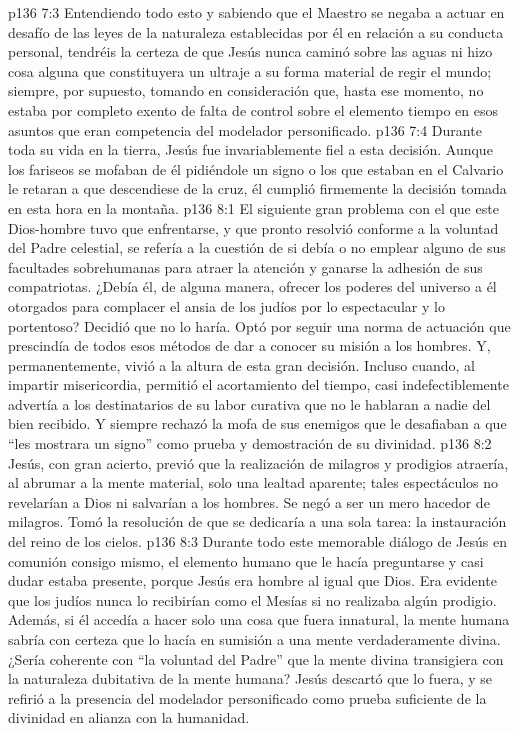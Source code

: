 \vs p136 7:3 \pc Entendiendo todo esto y sabiendo que el Maestro se negaba a actuar en desafío de las leyes de la naturaleza establecidas por él en relación a su conducta personal, tendréis la certeza de que Jesús nunca caminó sobre las aguas ni hizo cosa alguna que constituyera un ultraje a su forma material de regir el mundo; siempre, por supuesto, tomando en consideración que, hasta ese momento, no estaba por completo exento de falta de control sobre el elemento tiempo en esos asuntos que eran competencia del modelador personificado.
\vs p136 7:4 Durante toda su vida en la tierra, Jesús fue invariablemente fiel a esta decisión. Aunque los fariseos se mofaban de él pidiéndole un signo o los que estaban en el Calvario le retaran a que descendiese de la cruz, él cumplió firmemente la decisión tomada en esta hora en la montaña.
\vs p136 8:1 El siguiente gran problema con el que este Dios\hyp{}hombre tuvo que enfrentarse, y que pronto resolvió conforme a la voluntad del Padre celestial, se refería a la cuestión de si debía o no emplear alguno de sus facultades sobrehumanas para atraer la atención y ganarse la adhesión de sus compatriotas. ¿Debía él, de alguna manera, ofrecer los poderes del universo a él otorgados para complacer el ansia de los judíos por lo espectacular y lo portentoso? Decidió que no lo haría. Optó por seguir una norma de actuación que prescindía de todos esos métodos de dar a conocer su misión a los hombres. Y, permanentemente, vivió a la altura de esta gran decisión. Incluso cuando, al impartir misericordia, permitió el acortamiento del tiempo, casi indefectiblemente advertía a los destinatarios de su labor curativa que no le hablaran a nadie del bien recibido. Y siempre rechazó la mofa de sus enemigos que le desafiaban a que “les mostrara un signo” como prueba y demostración de su divinidad.
\vs p136 8:2 Jesús, con gran acierto, previó que la realización de milagros y prodigios atraería, al abrumar a la mente material, solo una lealtad aparente; tales espectáculos no revelarían a Dios ni salvarían a los hombres. Se negó a ser un mero hacedor de milagros. Tomó la resolución de que se dedicaría a una sola tarea: la instauración del reino de los cielos.
\vs p136 8:3 \pc Durante todo este memorable diálogo de Jesús en comunión consigo mismo, el elemento humano que le hacía preguntarse y casi dudar estaba presente, porque Jesús era hombre al igual que Dios. Era evidente que los judíos nunca lo recibirían como el Mesías si no realizaba algún prodigio. Además, si él accedía a hacer solo una cosa que fuera innatural, la mente humana sabría con certeza que lo hacía en sumisión a una mente verdaderamente divina. ¿Sería coherente con “la voluntad del Padre” que la mente divina transigiera con la naturaleza dubitativa de la mente humana? Jesús descartó que lo fuera, y se refirió a la presencia del modelador personificado como prueba suficiente de la divinidad en alianza con la humanidad.
